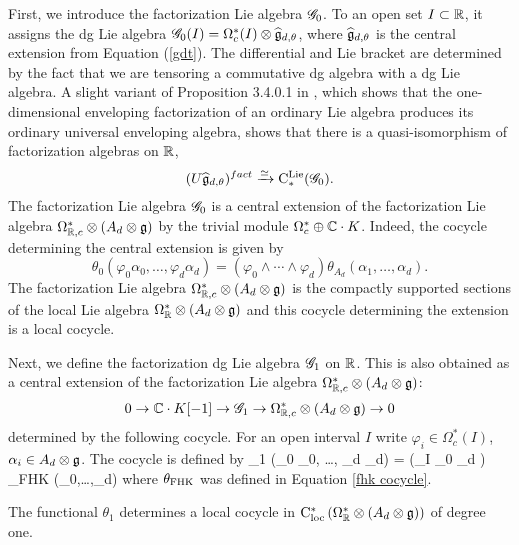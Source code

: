 First, we introduce the factorization Lie algebra $\mathscr G_0$. 
To an open set $I \subset \mathbb R$, it assigns the dg Lie algebra $\mathscr G_0(I) = \Omega^*_{c}(I) \otimes \widehat{\mathfrak g}_{d,\theta}$, where $\widehat{\mathfrak g}_{d,\theta}$ is the central extension from Equation (\ref{gdt}). The differential and Lie bracket are determined by the fact that we are tensoring a commutative dg algebra with a dg Lie algebra. A slight variant of Proposition 3.4.0.1 in \cite{CG1}, which shows that the one-dimensional enveloping factorization of an ordinary Lie algebra produces its ordinary universal enveloping algebra, shows that there is a quasi-isomorphism of factorization algebras on $\mathbb R$,
\[
(U \widehat{\mathfrak g}_{d,\theta})^{fact} \xrightarrow{\simeq} {\rm C}^{\rm Lie}_*(\mathscr G_0) .
\]
The factorization Lie algebra $\mathscr G_0$ is a central extension of the factorization Lie algebra $\Omega^*_{\mathbb R,c} \otimes (A_d \otimes \mathfrak g)$ by the trivial module $\Omega^*_c \oplus \mathbb C \cdot K$. Indeed, the cocycle determining the central extension is given by
\[
\theta_0 (\varphi_0 \alpha_0,\ldots,\varphi_d \alpha_d) = (\varphi_0 \wedge \cdots \wedge \varphi_d) \theta_{A_d}(\alpha_1,\ldots,\alpha_d) .
\] 
The factorization Lie algebra $\Omega^*_{\mathbb R,c} \otimes (A_d \otimes \mathfrak g)$ is the compactly supported sections of the local Lie algebra $\Omega^*_{\mathbb R} \otimes (A_d \otimes \mathfrak g)$ and this cocycle determining the extension is a local cocycle. 

Next, we define the factorization dg Lie algebra $\mathscr G_1$ on $\mathbb R$. This is also obtained as a central extension of the factorization Lie algebra $\Omega^{*}_{\mathbb R,c} \otimes (A_d \otimes \mathfrak g)$: 
\[
0 \to \mathbb C \cdot K [-1] \to \mathscr G_1 \to \Omega^{*}_{\mathbb R,c} \otimes (A_d \otimes \mathfrak g) \to 0
\]
determined by the following cocycle. For an open interval $I$ write $\varphi_i \in \Omega^*_c(I)$, $\alpha_i\in A_d \otimes \mathfrak g$. The cocycle is defined by
\beqn\label{cocycle 1}
\theta_1 (\varphi_0 \alpha_0, \ldots, \varphi_d \alpha_d) =  \left(\int_{I} \varphi_0 \wedge \cdots \varphi_d \right) \theta_{\rm FHK} (\alpha_0,\ldots,\alpha_d)
\eeqn
where $\theta_{\rm FHK}$ was defined in Equation \ref{fhk cocycle}.

The functional $\theta_1$ determines a local cocycle in ${\rm C}_{\rm loc}^*\left(\Omega^*_\mathbb R \otimes (A_d \otimes \mathfrak g)\right)$ of degree one. 

\def\dR{{\rm dR}}

